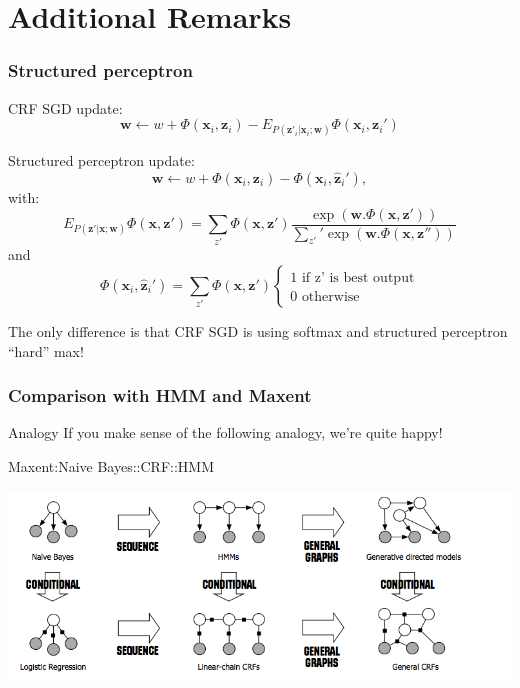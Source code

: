 \documentclass[usenames,dvipsnames]{beamer}
\newcommand{\x}{\mathbf{x}}
\newcommand{\w}{\mathbf{w}}
\newcommand{\z}{\mathbf{z}}
\begin{document}
\section{Additional Remarks}

\begin{frame}\frametitle{Structured perceptron}

CRF SGD update:
\begin{equation*}
 \w \leftarrow w + \Phi(\x_i,\z_i)- E_{P(\z'_i|\x_i;\w)} \Phi(\x_i,\z_i')
\end{equation*}

\vspace{0.4cm}
Structured perceptron update:
\begin{equation*}
 \w \leftarrow w + \Phi(\x_i,\z_i)- \Phi(\x_i,\hat{\z}_i'),
\end{equation*}
with:
\vspace{0.4cm}
\begin{equation*}
E_{P(\z'|\x;\w)} \Phi(\x,\z') = \sum_{z'} \Phi(\x,\z') \frac{\exp(\w . \Phi(\x,\z'))}{\sum_{z'}' \exp(\w. \Phi(\x,\z''))} 
\end{equation*}
and
\begin{equation*}
\Phi(\x_i,\hat{\z}_i') = \sum_{z'} \Phi(\x,\z') \begin{cases}
  1  \text{ if z' is best output}\\
  0  \text{ otherwise }
\end{cases}
\end{equation*}

\vspace{0.4cm}
The only difference is that CRF SGD is using softmax and structured
perceptron ``hard'' max!
\end{frame}


\begin{frame}\frametitle{Comparison with HMM and Maxent}

\begin{block}{Analogy}
If you make sense of the following analogy, we're quite happy!
\begin{center}
  Maxent:Naive Bayes::CRF::HMM
\end{center}
\end{block}

\pause
\begin{center}
\includegraphics[scale=0.4]{crfanalogy}
\end{center}

\end{frame}
\end{document}

